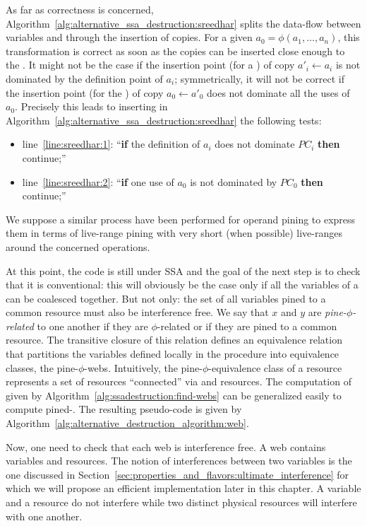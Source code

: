 As far as correctness is concerned, Algorithm~\ref{alg:alternative_ssa_destruction:sreedhar} splits the data-flow between variables and \phinodes through the insertion of copies. For a given \phifun $a_0=\phi(a_1,\dots,a_n)$, this transformation is correct as soon as the copies can be inserted close enough to the \phifun. It might not be the case if the insertion point (for a \useop) of copy $a'_i\gets a_i$ is not dominated by the definition point of $a_i$; symmetrically, it will not be correct if the insertion point (for the ) of copy $a_0\gets a'_0$ does not dominate all the uses of $a_0$. Precisely this leads to inserting in Algorithm~\ref{alg:alternative_ssa_destruction:sreedhar} the following tests:
\begin{itemize}
\item line~\ref{line:sreedhar:1}: ``{\bf if} the definition of $a_i$ does not dominate $PC_i$ {\bf then} continue;''
\item line~\ref{line:sreedhar:2}: ``{\bf if} one use of $a_0$ is not dominated by $PC_0$ {\bf then} continue;''
\end{itemize}
We suppose a similar process have been performed for operand pining to express them in terms of live-range pining with very short (when possible) live-ranges around the concerned operations. 

At this point, the code is still under SSA and the goal of the next step is to check that it is conventional: this will obviously be the case only if all the variables of a \phiweb can be coalesced together. But not only: the set of all variables pined to a common resource must also be interference free. 
We say that $x$ and $y$ are \emph{pine-$\phi$-related} to one another if they are $\phi$-related or if they are pined to a common resource. The transitive closure of this relation defines an equivalence relation that 
partitions the variables defined locally in the procedure into equivalence classes, the pine-$\phi$-webs.
Intuitively, the pine-$\phi$-equivalence class of a resource represents a set of resources ``connected'' via \phifuns and resources.
The computation of \phiwebs given by Algorithm~\ref{alg:ssadestruction:find-webs} can be generalized easily to compute pined-\phiwebs. The resulting pseudo-code is given by Algorithm~\ref{alg:alternative_destruction_algorithm:web}. 

Now, one need to check that each web is interference free. A web contains variables and resources. The notion of interferences between two variables is the one discussed in Section~\ref{sec:properties_and_flavors:ultimate_interference} for which we will propose an efficient implementation later in this chapter. A variable and a resource do not interfere while two distinct physical resources will interfere with one another.

